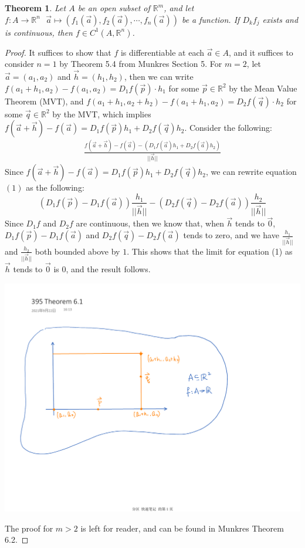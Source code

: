 \documentclass[11pt,oneside]{book}
\theoremstyle{break}
\theoremstyle{break}
\newtheorem{thm}{Theorem}[section]
\newcommand{\R}{\mathbb{R}}
\begin{document}
\begin{thm}
Let $A$ be an open subset of $\R^m$, and let $f:A \to \R^n \ \ \ \vec{a}\mapsto (f_1(\vec{a}),f_2(\vec{a}),\cdots, f_n(\vec{a}))$ be a function. If $D_kf_j$ exists and is continuous, then $f \in C^1(A,\R^n)$.
\end{thm}
\begin{proof}
It suffices to show that $f$ is differentiable at each $\vec{a}\in A$, and it suffices to consider $n=1$ by Theorem 5.4 from Munkres Section 5. For $m=2$, let $\vec{a}=(a_1,a_2)$ and $\vec{h}=(h_1,h_2)$, then we can write $f(a_1+h_1,a_2)-f(a_1,a_2) = D_1f(\vec{p})\cdot h_1$ for some $\vec{p}\in \R^2$ by the Mean Value Theorem (MVT), and $f(a_1+h_1,a_2+h_2) - f(a_1+h_1,a_2) = D_2f(\vec{q})\cdot h_2$ for some $\vec{q}\in \R^2$ by the MVT, which implies $f(\vec{a}+\vec{h})-f(\vec{a}) = D_1f(\vec{p})h_1+D_2f(\vec{q})h_2$. Consider the following:
\begin{align*}
\frac{f(\vec{a}+\vec{h})-f(\vec{a})-(D_1f(\vec{a})h_1+D_2f(\vec{a})h_2)}{||\vec{h}||} \tag{1} \end{align*} 
Since $f(\vec{a}+\vec{h})-f(\vec{a}) = D_1f(\vec{p})h_1+D_2f(\vec{q})h_2$,  we can rewrite equation $(1)$ as the following:
$$(D_1f(\vec{p})-D_1f(\vec{a}))\frac{h_1}{||\vec{h}||} - (D_2f(\vec{q})-D_2f(\vec{a}))\frac{h_2}{||\vec{h}||}$$
Since $D_1f$ and $D_2f$ are continuous, then we know that, when $\vec{h}$ tends to $\vec{0}$, $D_1f(\vec{p})-D_1f(\vec{a})$ and $D_2f(\vec{q})-D_2f(\vec{a})$ tends to zero, and we have $\frac{h_1}{||\vec{h}||}$ and $\frac{h_2}{||\vec{h}||}$ both bounded above by $1$. This shows that the limit for equation (1) as $\vec{h}$ tends to $\vec{0}$ is $0$, and the result follows.
\begin{center}
\includegraphics[scale=0.5]{thm6_1.pdf}
\end{center}
The proof for $m>2$ is left for reader, and can be found in Munkres Theorem 6.2.
\end{proof}
\end{document}
